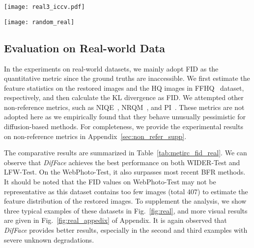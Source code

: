 \documentclass[10pt,twocolumn,letterpaper]{article}
\begin{document}
\begin{figure*}[t]
    \centering
    \texttt{[image: real3\_iccv.pdf]}
    \caption{Visual comparisons of different methods on the real-world examples from LFW-Test (first row),
        WebPhoto-Test (second row), and WIDER-Test (third row).}
    \label{fig:real}
    \vspace{-2mm}
\end{figure*}
\begin{figure*}[t]
    \centering
    \texttt{[image: random\_real]}
    \caption{Unlike most existing BFR methods, \textit{DifFace} can generate multiple
        diverse and plausible results given a LQ image, by setting different random seeds for
        the diffusion model. This example is extracted from real-world dataset WIDER-Test.}
    \label{fig:random_real}
\end{figure*}
\subsection{Evaluation on Real-world Data}\label{sec:exp_real}
In the experiments on real-world datasets, we mainly adopt FID as the quantitative metric since the ground truths are inaccessible. We first estimate the feature statistics on the restored images and the HQ images in FFHQ~\cite{karras2019style} dataset, respectively, and then calculate the KL divergence as FID. We attempted other non-reference metrics, such as NIQE~\cite{mittal2012making}, NRQM~\cite{ma2017learning}, and PI~\cite{blau20182018}. These metrics are not adopted here as we empirically found that they behave unusually pessimistic for diffusion-based methods. For completeness, we provide the experimental results on non-reference metrics in Appendix~\ref{sec:non_refer_supp}.

The comparative results are summarized in Table~\ref{tab:metirc_fid_real}. We can observe that \textit{DifFace} achieves the best performance on both WIDER-Test and LFW-Test. On the WebPhoto-Test, it also surpasses most recent BFR methods. It should be noted that the FID values on WebPhoto-Test may not be representative as this dataset contains too few images (total 407) to estimate the feature distribution of the restored images. To supplement the analysis, we show three typical examples of these datasets in Fig.~\ref{fig:real}, and more visual results are given in Fig.~\ref{fig:real_appedix} of Appendix. It is again observed that \textit{DifFace} provides better results, especially in the second and third examples with severe unknown degradations.
\end{document}
